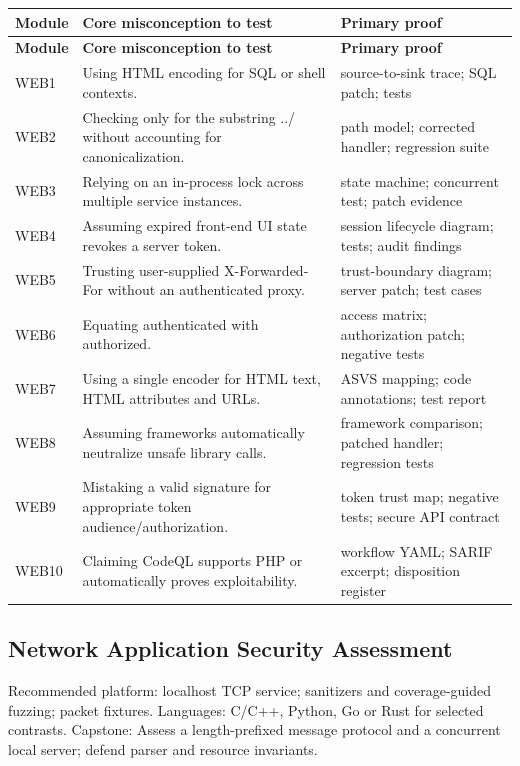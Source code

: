 \documentclass[10pt,letterpaper]{article}
\begin{document}
\begingroup\footnotesize\setlength\tabcolsep{3pt}
\begin{longtable}{>{\raggedright\arraybackslash}p{}>{\raggedright\arraybackslash}p{}>{\raggedright\arraybackslash}p{}}\toprule
\textbf{Module} & \textbf{Core misconception to test} & \textbf{Primary proof}\\\midrule\endfirsthead
\toprule \textbf{Module} & \textbf{Core misconception to test} & \textbf{Primary proof}\\\midrule\endhead
WEB1 & Using HTML encoding for SQL or shell contexts. & source-to-sink trace; SQL patch; tests\\\midrule
WEB2 & Checking only for the substring ../ without accounting for canonicalization. & path model; corrected handler; regression suite\\\midrule
WEB3 & Relying on an in-process lock across multiple service instances. & state machine; concurrent test; patch evidence\\\midrule
WEB4 & Assuming expired front-end UI state revokes a server token. & session lifecycle diagram; tests; audit findings\\\midrule
WEB5 & Trusting user-supplied X-Forwarded-For without an authenticated proxy. & trust-boundary diagram; server patch; test cases\\\midrule
WEB6 & Equating authenticated with authorized. & access matrix; authorization patch; negative tests\\\midrule
WEB7 & Using a single encoder for HTML text, HTML attributes and URLs. & ASVS mapping; code annotations; test report\\\midrule
WEB8 & Assuming frameworks automatically neutralize unsafe library calls. & framework comparison; patched handler; regression tests\\\midrule
WEB9 & Mistaking a valid signature for appropriate token audience/authorization. & token trust map; negative tests; secure API contract\\\midrule
WEB10 & Claiming CodeQL supports PHP or automatically proves exploitability. & workflow YAML; SARIF excerpt; disposition register\\\midrule
\bottomrule\end{longtable}\endgroup
\subsection{Network Application Security Assessment}
Recommended platform: localhost TCP service; sanitizers and coverage-guided fuzzing; packet fixtures. Languages: C/C++, Python, Go or Rust for selected contrasts. Capstone: Assess a length-prefixed message protocol and a concurrent local server; defend parser and resource invariants.
\end{document}
